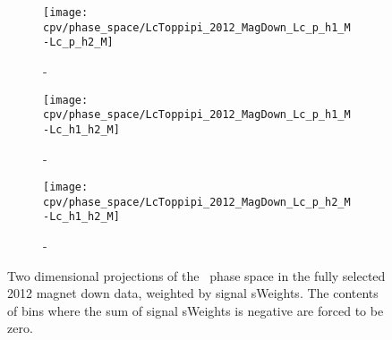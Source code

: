 \begin{figure}
  \begin{subfigure}{0.5\textwidth}
    \texttt{[image: cpv/phase\_space/LcToppipi\_2012\_MagDown\_Lc\_p\_h1\_M-Lc\_p\_h2\_M]}
    \label{fig:cpv:phsp:data:ppipi:msqphm_msqphp}
    \caption{\msqphm-\msqphp}
  \end{subfigure}
  \begin{subfigure}{0.5\textwidth}
    \texttt{[image: cpv/phase\_space/LcToppipi\_2012\_MagDown\_Lc\_p\_h1\_M-Lc\_h1\_h2\_M]}
    \label{fig:cpv:phsp:data:ppipi:msqphp_msqhh}
    \caption{\msqphm-\msqhh}
  \end{subfigure}
  \begin{subfigure}{0.5\textwidth}
    \texttt{[image: cpv/phase\_space/LcToppipi\_2012\_MagDown\_Lc\_p\_h2\_M-Lc\_h1\_h2\_M]}
    \label{fig:cpv:phsp:data:ppipi:msqpp_msqhh}
    \caption{\msqphp-\msqhh}
  \end{subfigure}
  \caption{%
    Two dimensional projections of the \LcToppipi\ phase space in the fully 
    selected 2012 magnet down data, weighted by signal sWeights.
    The contents of bins where the sum of signal sWeights is negative are 
    forced to be zero.
  }
  \label{fig:cpv:phsp:data_2D:ppipi}
\end{figure}

